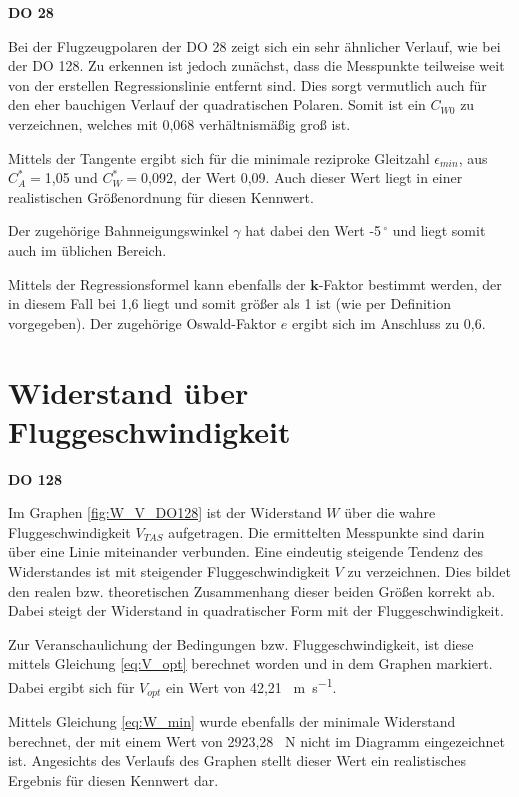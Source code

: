 \textbf{DO 28}

Bei der Flugzeugpolaren der DO 28 zeigt sich ein sehr ähnlicher Verlauf, wie bei der DO 128. Zu erkennen ist jedoch zunächst, dass die Messpunkte teilweise weit von der erstellen Regressionslinie entfernt sind. Dies sorgt vermutlich auch für den eher bauchigen Verlauf der quadratischen Polaren. Somit ist ein $C_{W0}$ zu verzeichnen, welches mit 0,068 verhältnismäßig groß ist. 

Mittels der Tangente ergibt sich für die minimale reziproke Gleitzahl $\epsilon_{min}$, aus $C_A^*=$1,05 und $C_W^*=$0,092, der Wert 0,09. Auch dieser Wert liegt in einer realistischen Größenordnung für diesen Kennwert.

Der zugehörige Bahnneigungswinkel $\gamma$ hat dabei den Wert -5$^{\ \circ}$ und liegt somit auch im üblichen Bereich. 

Mittels der Regressionsformel kann ebenfalls der $\textbf{k}$-Faktor bestimmt werden, der in diesem Fall bei 1,6 liegt und somit größer als 1 ist (wie per Definition vorgegeben). Der zugehörige Oswald-Faktor $e$ ergibt sich im Anschluss zu 0,6. 

\section{Widerstand über Fluggeschwindigkeit}

\textbf{DO 128}

Im Graphen \ref{fig:W_V_DO128} ist der Widerstand $W$ über die wahre Fluggeschwindigkeit $V_{TAS}$ aufgetragen. Die ermittelten Messpunkte sind darin über eine Linie miteinander verbunden. Eine eindeutig steigende Tendenz des Widerstandes ist mit steigender Fluggeschwindigkeit $V$ zu verzeichnen. Dies bildet den realen bzw. theoretischen Zusammenhang dieser beiden Größen korrekt ab. Dabei steigt der Widerstand in quadratischer Form mit der Fluggeschwindigkeit.

Zur Veranschaulichung der \grqq{ } Bedingungen bzw. Fluggeschwindigkeit, ist diese mittels Gleichung \ref{eq:V_opt} berechnet worden und in dem Graphen markiert. Dabei ergibt sich für $V_{opt}$ ein Wert von 42,21 \SI{}{\meter\per\second}.

Mittels Gleichung \ref{eq:W_min} wurde ebenfalls der minimale Widerstand berechnet, der mit einem Wert von 2923,28 \SI{}{\newton} nicht im Diagramm eingezeichnet ist. Angesichts des Verlaufs des Graphen stellt dieser Wert ein realistisches Ergebnis für diesen Kennwert dar.

